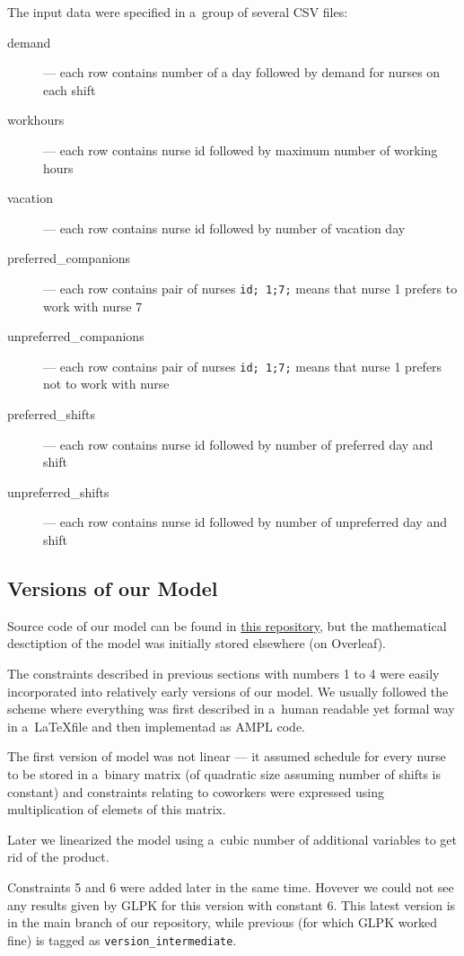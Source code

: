 The input data were specified in a~group of several CSV files:

\begin{description}
    \item[demand] --- each row contains number of a day followed by demand for nurses on each shift
    \item[workhours] --- each row contains nurse id followed by maximum number of working hours
    \item[vacation] --- each row contains nurse id followed by number of vacation day
    \item[preferred\_companions] --- each row contains pair of nurses \texttt{id; 1;7;} means that nurse 1 prefers to work with nurse 7
    \item[unpreferred\_companions] --- each row contains pair of nurses \texttt{id; 1;7;} means that nurse 1 prefers not to work with nurse
    \item[preferred\_shifts] --- each row contains nurse id followed by number of preferred day and shift
    \item[unpreferred\_shifts] --- each row contains nurse id followed by number of unpreferred day and shift
\end{description}

\subsection{Versions of our Model}

Source code of our model can be found in \href{https://github.com/szczor/uzytki\_ampl}{this repository}, but the mathematical desctiption of the model was initially stored elsewhere (on Overleaf).

The constraints described in previous sections with numbers 1 to 4 were easily incorporated into relatively early versions of our model. We usually followed the scheme where everything was first described in a~human readable yet formal way in a~\LaTeX file and then implementad as AMPL code.

The first version of model was not linear --- it assumed schedule for every nurse to be stored in a~binary matrix (of quadratic size assuming number of shifts is constant) and constraints relating to coworkers were expressed using multiplication of elemets of this matrix.

Later we linearized the model using a~cubic number of additional variables to get rid of the product.

Constraints 5 and 6 were added later in the same time. Hovever we could not see any results given by GLPK for this version with constant 6. This latest version is in the main branch of our repository, while previous (for which GLPK worked fine) is tagged as \texttt{version\_intermediate}.
